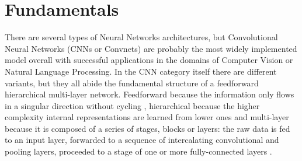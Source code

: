 \documentclass[class=report, crop=false, a4paper, 12pt]{standalone}
\begin{document}
\section{Fundamentals}



%


There are several types of Neural Networks architectures, but Convolutional Neural Networks (CNNs or Convnets) are probably the most widely implemented model overall \autocite{yamashitaConvolutionalNeuralNetworks2018, liSurveyConvolutionalNeural2022} with successful applications in the domains of Computer Vision \autocite{krizhevskyImageNetClassificationDeep2012,taigmanDeepFaceClosingGap2014,tompsonEfficientObjectLocalization2015, zhangImprovedBreastCancer2021} or Natural Language Processing\autocite{abdel-hamidConvolutionalNeuralNetworks2014, wangGenCNNConvolutionalArchitecture2015, xiangConvolutionalNeuralNetworkbased2020}. In the CNN category itself there are different variants, but they all abide the fundamental structure of a feedforward hierarchical multi-layer network. Feedforward because the information only flows in a singular direction without cycling \autocite{zellSimulationNeuronalerNetze1994}, hierarchical because the higher complexity internal representations are learned from lower ones \autocite{lecunDeepLearning2015, zhuBCNNBranchConvolutional2017} and multi-layer because it is composed of a series of stages, blocks or layers: the raw data is fed to an input layer, forwarded to a sequence of intercalating convolutional and pooling layers, proceeded to a stage of one or more fully-connected layers \autocite{lecunDeepLearning2015, yamashitaConvolutionalNeuralNetworks2018, guRecentAdvancesConvolutional2018, alzubaidiReviewDeepLearning2021}.
\end{document}
